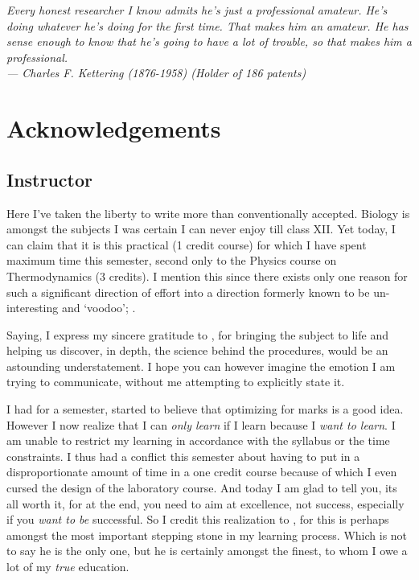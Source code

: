 
\begin{flushright}{\slshape    
Every honest researcher I know admits he's just a professional amateur.
He's doing whatever he's doing for the first time. That makes him an amateur.
He has sense enough to know that he's going to have a lot of trouble,
so that makes him a professional.\\ \medskip
--- Charles F. Kettering (1876-1958) (Holder of 186 patents)}
\end{flushright}



\bigskip

\begingroup
\let\clearpage\relax
\let\cleardoublepage\relax
\let\cleardoublepage\relax
\chapter*{Acknowledgements}
\section*{Instructor}
	Here I've taken the liberty to write more than conventionally accepted. Biology is amongst the subjects I was certain I can never enjoy till class XII. Yet today, I can claim that it is this practical (1 credit course) for which I have spent maximum time this semester, second only to the Physics course on Thermodynamics (3 credits). I mention this since there exists only one reason for such a significant direction of effort into a direction formerly known to be un-interesting and `voodoo'; \myProf.
	\par
	Saying, I express my sincere gratitude to \myProf, for bringing the subject to life and helping us discover, in depth, the science behind the procedures, would be an astounding understatement. I hope you can however imagine the emotion I am trying to communicate, without me attempting to explicitly state it.
	\par
	I had for a semester, started to believe that optimizing for marks is a good idea. However I now realize that I can \emph{only learn} if I learn because I \emph{want to learn}. I am unable to restrict my learning in accordance with the syllabus or the time constraints. I thus had a conflict this semester about having to put in a disproportionate amount of time in a one credit course because of which I even cursed the design of the laboratory course. And today I am glad to tell you, its all worth it, for at the end, you need to aim at excellence, not success, especially if you \emph{want to be} successful. So I credit this realization to \myProf, for this is perhaps amongst the most important stepping stone in my learning process. Which is not to say he is the only one, but he is certainly amongst the finest, to whom I owe a lot of my \emph{true} education.\\
	\par
